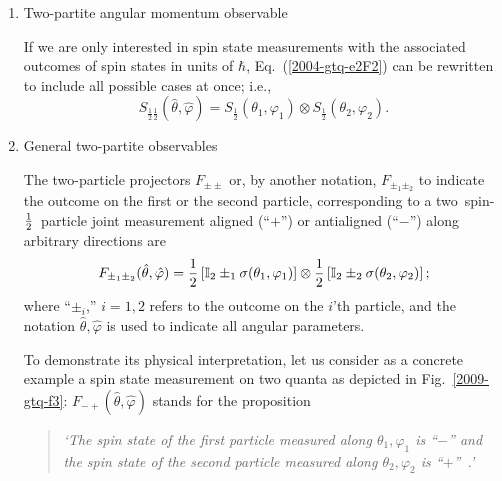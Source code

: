 \documentclass[pra,amsfonts,showpacs,showkeys,preprint]{revtex4}
\begin{document}
\begin{enumerate}

\item{Two-partite angular momentum observable}

If we are only interested in spin state measurements with the associated outcomes of spin states in units of $\hbar$,
Eq.~(\ref{2004-gtq-e2F2}) can be rewritten to include all possible cases at once; i.e.,
\begin{equation}
 S_{\frac{1}{2} \frac{1}{2} } ({\hat \theta},{\hat \varphi} ) =
S_{\frac{1}{2} }( \theta_1,\varphi_1 )
\otimes
S_{\frac{1}{2} }( \theta_2,\varphi_2 ).
\label{2004-gtq-e2F2nat}
\end{equation}

\item{General two-partite observables}


The two-particle projectors
$F_{\pm \pm }$ or, by another notation, $F_{\pm_1 \pm_2 }$ to indicate the outcome on the first or the second particle,
corresponding to a two~spin-${1\over 2}$~particle joint measurement
aligned (``$+$'') or antialigned  (``$-$'') along arbitrary directions are
\begin{equation}
 F_{\pm_1 \pm_2 } ({\hat \theta},{\hat \varphi} ) =
{\frac{1}{2}}\left[{\mathbb I}_2 \pm_1 {\bf \sigma}( \theta_1,\varphi_1 )\right]
\otimes
{\frac{1}{2}}\left[{\mathbb I}_2 \pm_2 {\bf \sigma}( \theta_2,\varphi_2 )\right];
\label{2004-gtq-e2F2}
\end{equation}
where ``$\pm_i$,'' $i=1,2$ refers to the outcome on the $i$'th particle,
and the notation ${\hat \theta},{\hat \varphi}$ is used to indicate all angular parameters.

To demonstrate its physical interpretation, let us consider as a concrete example
a spin state measurement on two quanta as depicted in Fig.~\ref{2009-gtq-f3}:
$F_{- +  } ({\hat \theta},{\hat \varphi} )$ stands for the proposition
\begin{quote}
{\em `The spin state of the first particle measured along $\theta_1,\varphi_1$ is ``$-$''
      and
      the spin state of the second particle measured along $\theta_2,\varphi_2$ is ``$+$''~.'
}
\end{quote}


\end{enumerate}
\end{document}

